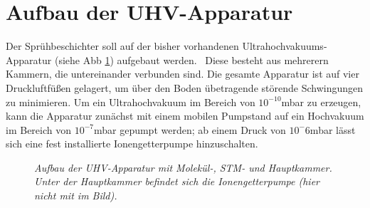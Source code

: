 \section{Aufbau der UHV-Apparatur}

Der Sprühbeschichter soll auf der bisher vorhandenen Ultrahochvakuums-Apparatur (siehe Abb
\ref{uhvaufbau}) aufgebaut werden.~%
 Diese besteht aus mehrerern Kammern, die untereinander verbunden sind. Die gesamte Apparatur ist
auf vier Druckluftfüßen gelagert, um über den Boden übetragende störende Schwingungen zu minimieren. Um ein
Ultrahochvakuum im Bereich von $10^{-10}$mbar zu erzeugen, kann die Apparatur zunächst mit einem
mobilen Pumpstand %
auf ein Hochvakuum im Bereich von
$10^{-7}$mbar gepumpt werden; ab einem Druck von $10^-6$mbar lässt sich eine fest installierte
Ionengetterpumpe hinzuschalten.

\begin{figure}[H]
\centering
\sffamily

\caption{\textit{Aufbau der UHV-Apparatur mit Molekül-, STM- und Hauptkammer. Unter der
Hauptkammer befindet sich die Ionengetterpumpe (hier nicht mit im Bild).}}
\label{uhvaufbau}
\end{figure}

